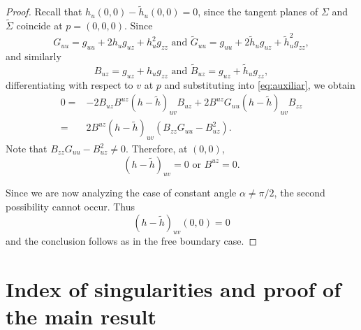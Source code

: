 \documentclass[11pt,reqno]{amsart}
\begin{document}
\begin{proof}
Recall that $h_u(0,0)-\widetilde{h}_u(0,0)=0$, since the tangent planes of $\Sigma$ and $\widetilde{\Sigma}$ coincide at $p=(0,0,0)$. Since
\begin{equation*}
    G_{uu}=g_{uu}+2h_u g_{uz} + h^2_u g_{zz} \text{ and } \widetilde{G}_{uu}=g_{uu}+2\widetilde{h}_u g_{uz} + \widetilde{h}^2_u g_{zz},
\end{equation*}
and similarly
\begin{equation*}
    B_{uz}=g_{uz}+h_u g_{zz} \text{ and } \widetilde{B}_{uz}=g_{uz}+\widetilde{h}_u g_{zz},
\end{equation*}
differentiating with respect to $v$ at $p$ and substituting into \eqref{eq:auxiliar}, we obtain
\begin{align*}
    0= & -2B_{uz}B^{uz}(h-\widetilde{h})_{uv}B_{uz}+2B^{uz}G_{uu}(h-\widetilde{h})_{uv} B_{zz} \\
    = & 2B^{uz}(h-\widetilde{h})_{uv}(B_{zz}G_{uu}-B_{uz}^2).
\end{align*}
Note that $B_{zz}G_{uu}-B^2_{uz}\neq 0$. Therefore, at $(0,0)$,
\begin{equation*}
    (h-\widetilde{h})_{uv}=0 \text{ or } B^{uz}=0. 
\end{equation*}

Since we are now analyzing the case of constant angle $\alpha\neq \pi/2$, the second possibility cannot occur. Thus
\begin{equation*}
    (h-\widetilde{h})_{uv}(0,0)=0 
\end{equation*}
and the conclusion follows as in the free boundary case.    
\end{proof}

\section{Index of singularities and proof of the main result}



\end{document}

